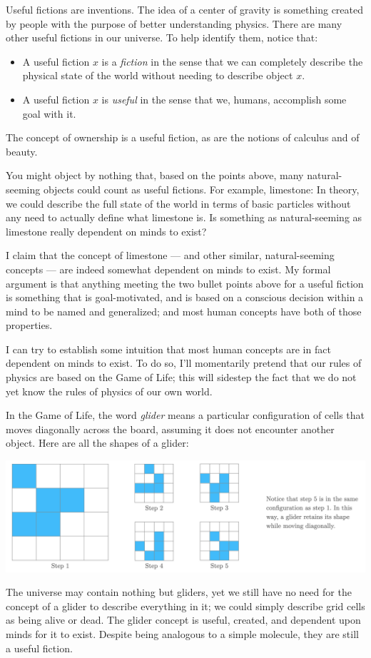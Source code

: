 \documentclass[9pt, twoside]{book}
\theoremstyle{argtstyle}
\begin{document}
Useful fictions are inventions.
The idea of a center of gravity is something created by
people with the purpose of better understanding physics.
There are many other useful fictions in our universe. To help identify them,
notice that:
\begin{itemize}
    \item A useful fiction $x$ is a {\em fiction}
        in the sense that we can completely
        describe the physical state of the world without needing to describe
        object $x$.
    \item A useful fiction $x$ is {\em useful} in the sense that we, humans,
        accomplish some goal with it.
\end{itemize}
The concept of ownership is a useful fiction, as are the notions of
calculus and of beauty.

You might object by nothing that, based on the points above,
many natural-seeming objects could count as useful fictions.
For example, limestone: In theory, we could describe the full state of the world
in terms of basic particles without any need to actually
define what limestone is. Is something as natural-seeming as limestone really
dependent on minds to exist?

I claim that the concept of limestone --- and other similar, natural-seeming
concepts --- are indeed somewhat dependent on minds to exist.
My formal argument is that anything meeting the two bullet points above for a
useful fiction is something that is goal-motivated, and is based on a conscious
decision within a mind to be named and generalized; and most human concepts have
both of those properties.

I can try to establish some intuition that most human concepts are in fact
dependent on minds to exist. To do so, I'll momentarily pretend that our rules
of physics are based on the Game of Life; this will sidestep the fact that we do
not yet know the rules of physics of our own world.

In the Game of Life, the word {\em glider} means a particular 
configuration of cells that moves diagonally across the board, assuming it does
not encounter another object.
% 
% 
Here are all the shapes of a glider:
\begin{center}
\includegraphics[width=\textwidth]{glider2.png}
\end{center}
The universe may contain nothing but gliders, yet we still have no need
for the concept of a glider to describe everything in it; we could simply
describe grid cells as being alive or dead.
The glider concept is useful, created, and dependent upon minds for it to
exist. Despite being analogous to a simple molecule, they are still a useful
fiction.
\end{document}
